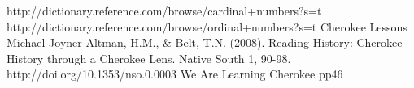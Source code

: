 

\begin{thebibliography}{99}
 http://dictionary.reference.com/browse/cardinal+numbers?s=t
 http://dictionary.reference.com/browse/ordinal+numbers?s=t
 Cherokee Lessons Michael Joyner
 Altman, H.M., \& Belt, T.N. (2008). Reading History: Cherokee History through a Cherokee Lens. Native South 1, 90-98. http://doi.org/10.1353/nso.0.0003
 We Are Learning Cherokee pp46
\end{thebibliography}

